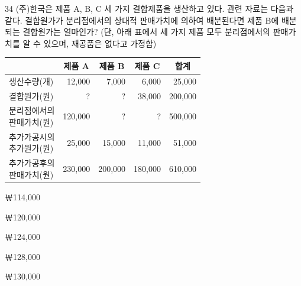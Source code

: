 \begin{question}{34}
(주)한국은 제품 A, B, C 세 가지 결합제품을 생산하고 있다. 관련 자료는 다음과 같다. 결합원가가 분리점에서의 상대적 판매가치에 의하여 배분된다면 제품 B에 배분되는 결합원가는 얼마인가? (단, 아래 표에서 세 가지 제품 모두 분리점에서의 판매가치를 알 수 있으며, 재공품은 없다고 가정함)

{\small\centering
\begin{tabular}{|l|r|r|r|r|}
\hline
 & \multicolumn{1}{c|}{제품 A} & \multicolumn{1}{c|}{제품 B} & \multicolumn{1}{c|}{제품 C} & \multicolumn{1}{c|}{합계} \\
\hline
생산수량(개) & 12,000 & 7,000 & 6,000 & 25,000 \\
\hline
결합원가(원) & ? & ? & 38,000 & 200,000 \\
\hline
\makecell[l]{분리점에서의\\판매가치(원)} & 120,000 & ? & ? & 500,000 \\
\hline
\makecell[l]{추가가공시의\\추가원가(원)} & 25,000 & 15,000 & 11,000 & 51,000 \\
\hline
\makecell[l]{추가가공후의\\판매가치(원)} & 230,000 & 200,000 & 180,000 & 610,000 \\
\hline
\end{tabular}\par}

\begin{choices}
  \item ￦114,000
  \item ￦120,000
  \item ￦124,000
  \item ￦128,000
  \item ￦130,000
\end{choices}
\end{question}
